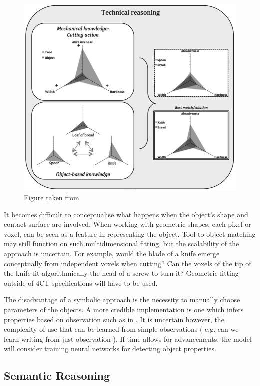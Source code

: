 \documentclass[11]{article}
\begin{document}
\begin{figure}[h]
	\label{fig:knife}
	\centering
	\includegraphics[width=1\textwidth]{knife.png}
	\caption { Figure taken from \cite{osiurak2014} }
\end{figure}

It becomes difficult to conceptualise what happens when the object's shape and contact surface are involved. When working with geometric shapes, each pixel or voxel, can be seen as a feature in representing the object. Tool to object matching may still function on such multidimensional fitting, but the scalability of the approach is uncertain. For example, would the blade of a knife emerge conceptually from independent voxels  when cutting? Can the voxels of the tip of the knife fit algorithmically the head of a screw to turn it? Geometric fitting outside of 4CT specifications will have to be used.

The disadvantage of a symbolic approach is the necessity to manually choose parameters of the objects. A more credible implementation is one which infers properties based on observation such as in \cite{zhu2015}. It is uncertain however, the complexity of use that can be learned from simple observations ( e.g. can we learn writing from just observation ). If time allows for advancements, the  model will consider training neural networks for detecting object properties.

\subsection{Semantic Reasoning}
\end{document}
